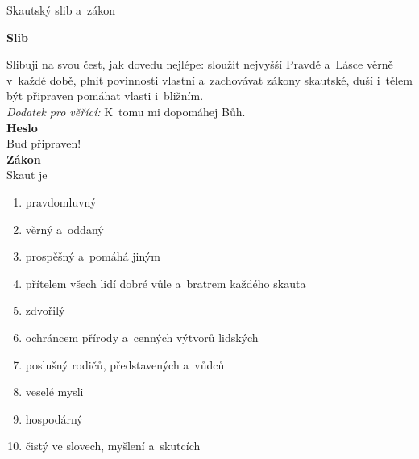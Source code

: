 \documentclass[compress,xelatex,xcolor=dvipsnames,print]{beamer}
\begin{document}
\begin{frame}{Skautský slib a~zákon}
\begin{multicols}{3}
\textbf{Slib}

Slibuji na svou čest, jak dovedu nejlépe: sloužit nejvyšší Pravdě a~Lásce věrně v~každé době, plnit povinnosti vlastní a~zachovávat zákony skautské, duší i~tělem být připraven pomáhat vlasti i~bližním.\\
\textit{Dodatek pro věřící:} K~tomu mi dopomáhej Bůh.\\
\columnbreak
\textbf{Heslo}\\ Buď připraven!\\
\vfil
\textbf{Zákon}\\
Skaut je
\begin{enumerate}
 \item pravdomluvný
 \item věrný a~oddaný
 \item prospěšný a~pomáhá jiným
 \item přítelem všech lidí dobré vůle a~bratrem každého skauta
\end{enumerate}
\columnbreak
\begin{enumerate}
 \setcounter{enumi}{4}
 \item zdvořilý
 \item ochráncem přírody a~cenných výtvorů lidských
 \item poslušný rodičů, představených a~vůdců
 \item veselé mysli
 \item hospodárný
 \item čistý ve slovech, myšlení a~skutcích
\end{enumerate}
\end{multicols}
\end{frame}
\end{document}
